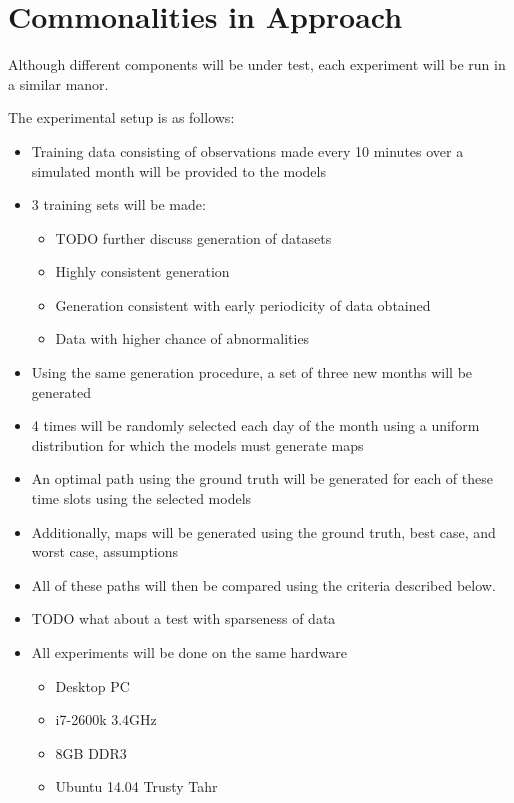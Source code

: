   \section{ Commonalities in Approach }
  Although different components will be under test, each experiment will be run
  in a similar manor.

  The experimental setup is as follows:

  \begin{itemize}

    \item Training data consisting of observations made every 10 minutes over a simulated month will
          be provided to the models

    \item 3 training sets will be made:
      \begin{itemize}

        \item TODO further discuss generation of datasets

        \item Highly consistent generation

        \item Generation consistent with early periodicity of data obtained

        \item Data with higher chance of abnormalities

      \end{itemize}

    \item Using the same generation procedure, a set of three new months will be
          generated

    \item 4 times will be randomly selected each day of the month using a
          uniform distribution for which the models must generate maps

    \item An optimal path using the ground truth will be generated for each of
          these time slots using the selected models

    \item Additionally, maps will be generated using the ground truth, best
          case, and worst case, assumptions

    \item All of these paths will then be compared using the criteria described
          below.

    \item TODO what about a test with sparseness of data

    \item All experiments will be done on the same hardware
      \begin{itemize}
        \item Desktop PC
        \item i7-2600k 3.4GHz
        \item 8GB DDR3
        \item Ubuntu 14.04 Trusty Tahr
      \end{itemize}

  \end{itemize}


